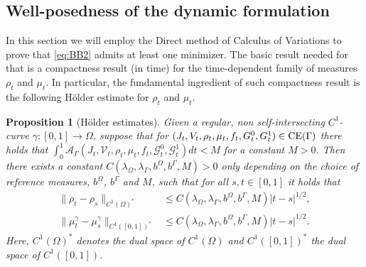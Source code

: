 \documentclass{article}
\def\calA{{\mathcal A}} \def\calB{{\mathcal B}} \def\calC{{\mathcal C}}
\newtheorem{proposition}[theorem]{Proposition}
\begin{document}
\subsection{Well-posedness of the dynamic formulation}\label{sec:WellPsdnFP}
In this section
we will employ the Direct method of Calculus of Variations to prove that \eqref{eq:BB2} admits at least one minimizer. 
The basic result needed for that is a compactness result (in time) for the time-dependent family of measures $\rho_t$ and $\mu_t$. In particular, the fundamental ingredient of such compactness result is the following Hölder estimate for $\rho_t$ and $\mu_t$. 
\begin{proposition}[Hölder estimates]\label{prop:holder}
    Given a regular, non self-intersecting $C^1$-curve $\gamma : [0,1] \rightarrow \Omega$, suppose that for $(J_t,V_t,\rho_t,\mu_t,f_t,G^0_t,G^1_t) \in {\rm CE(\Gamma)}$ there holds that $\int_0^1 \calA_\Gamma(J_t,\mathcal{V}_t,\rho_t,\mu_t,f_t, \mathcal{G}^0_t,\mathcal{G}^1_t)dt < M$ for a constant $M  > 0$. Then there exists a constant $C(\lambda_\Omega, \lambda_\Gamma, b^\Omega, b^\Gamma,M) >0$ only depending on the choice of reference measures, $b^\Omega$, $b^\Gamma$ and $M$, such that for all $s,t \in [0,1]$ it holds that
    \begin{align}\label{eq:est1}
        \|\rho_t - \rho_s\|_{C^1(\Omega)^*} &\leq  C(\lambda_\Omega, \lambda_\Gamma, b^\Omega, b^\Gamma,M)|t-s|^{1/2},
        \\\label{eq:est2}
        \|\mu^\gamma_t - \mu^\gamma_s\|_{C^1([0,1])^*} &\leq C(\lambda_\Omega, \lambda_\Gamma, b^\Omega, b^\Gamma,M)|t-s|^{1/2}.
    \end{align}
    Here, $C^1(\Omega)^*$ denotes the dual space of $C^1(\Omega)$ and $C^1([0,1])^*$ the dual space of $C^1([0,1])$.
\end{proposition}
\end{document}
